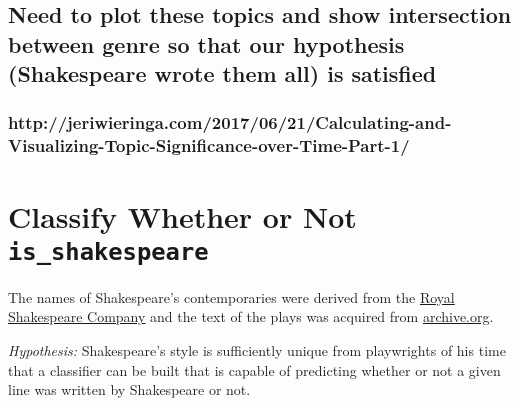 \documentclass[11pt]{article}
\begin{document}
    \subsection{Need to plot these topics and show intersection between
genre so that our hypothesis (Shakespeare wrote them all) is
satisfied}\label{need-to-plot-these-topics-and-show-intersection-between-genre-so-that-our-hypothesis-shakespeare-wrote-them-all-is-satisfied}

\subsubsection{http://jeriwieringa.com/2017/06/21/Calculating-and-Visualizing-Topic-Significance-over-Time-Part-1/}\label{httpjeriwieringa.com20170621calculating-and-visualizing-topic-significance-over-time-part-1}

    \section{\texorpdfstring{Classify Whether or Not
\texttt{is\_shakespeare}}{Classify Whether or Not is\_shakespeare}}\label{classify-whether-or-not-is_shakespeare}

The names of Shakespeare's contemporaries were derived from the
\href{https://www.rsc.org.uk/shakespeares-contemporaries/meet-the-contemporaries}{Royal
Shakespeare Company} and the text of the plays was acquired from
\href{https://archive.org}{archive.org}.

\emph{Hypothesis:} Shakespeare's style is sufficiently unique from
playwrights of his time that a classifier can be built that is capable
of predicting whether or not a given line was written by Shakespeare or
not.
\end{document}
